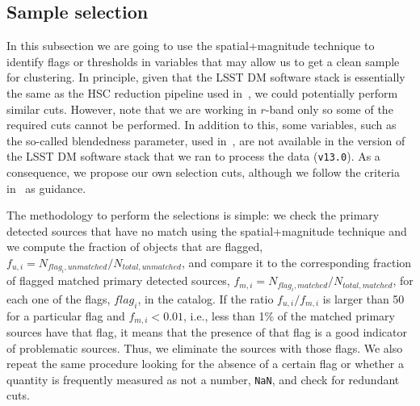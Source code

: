\documentclass[twocolumn]{aastex62}
\begin{document}
\subsection{Sample selection}
\label{ssec:sample_selection}

In this subsection we are going to use the spatial+magnitude technique to identify flags or thresholds in variables that may allow us to get a clean sample for clustering. In principle, given that the LSST DM software stack is essentially the same as the HSC reduction pipeline used in~\citet{2018PASJ...70S..25M}, we could potentially perform similar cuts. However, note that we are working in $r$-band only so some of the required cuts cannot be performed. In addition to this, some variables, such as the so-called blendedness parameter, used in~\citet{2018PASJ...70S..25M}, are not available in the version of the LSST DM software stack that we ran to process the data (\texttt{v13.0}). As a consequence, we propose our own selection cuts, although we follow the criteria in~\citet{2018PASJ...70S..25M} as guidance.


The methodology to perform the selections is simple: we check the primary detected sources that have no match using the spatial+magnitude technique and we compute the fraction of objects that are flagged, $f_{u,i} = N_{flag_{i}, unmatched}/N_{total, unmatched}$, and compare it to the corresponding fraction of flagged matched primary detected sources, $f_{m,i} = N_{flag_{i}, matched}/N_{total, matched}$, for each one of the flags, $flag_{i}$, in the catalog. If the ratio $f_{u,i}/f_{m,i}$ is larger than 50 for a particular flag and $f_{m,i} < 0.01$, i.e., less than 1\% of the matched primary sources have that flag, it means that the presence of that flag is a good indicator of problematic sources. Thus, we eliminate the sources with those flags. We also repeat the same procedure looking for the absence of a certain flag or whether a quantity is frequently measured as not a number, \texttt{NaN}, and check for redundant cuts. 
\end{document}
